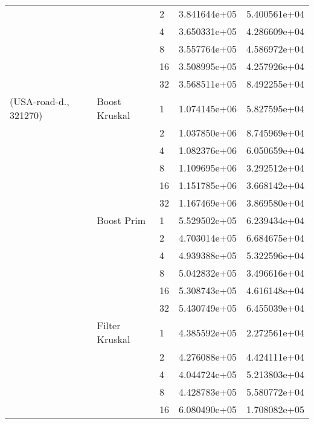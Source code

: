 \begin{tabular}{lllrr}
                       &                    & 2  &  3.841644e+05 &  5.400561e+04 \\
                       &                    & 4  &  3.650331e+05 &  4.286609e+04 \\
                       &                    & 8  &  3.557764e+05 &  4.586972e+04 \\
                       &                    & 16 &  3.508995e+05 &  4.257926e+04 \\
                       &                    & 32 &  3.568511e+05 &  8.492255e+04 \\
(USA-road-d., 321270) & Boost Kruskal & 1  &  1.074145e+06 &  5.827595e+04 \\
                       &                    & 2  &  1.037850e+06 &  8.745969e+04 \\
                       &                    & 4  &  1.082376e+06 &  6.050659e+04 \\
                       &                    & 8  &  1.109695e+06 &  3.292512e+04 \\
                       &                    & 16 &  1.151785e+06 &  3.668142e+04 \\
                       &                    & 32 &  1.167469e+06 &  3.869580e+04 \\
                       & Boost Prim & 1  &  5.529502e+05 &  6.239434e+04 \\
                       &                    & 2  &  4.703014e+05 &  6.684675e+04 \\
                       &                    & 4  &  4.939388e+05 &  5.322596e+04 \\
                       &                    & 8  &  5.042832e+05 &  3.496616e+04 \\
                       &                    & 16 &  5.308743e+05 &  4.616148e+04 \\
                       &                    & 32 &  5.430749e+05 &  6.455039e+04 \\
                       & Filter Kruskal & 1  &  4.385592e+05 &  2.272561e+04 \\
                       &                    & 2  &  4.276088e+05 &  4.424111e+04 \\
                       &                    & 4  &  4.044724e+05 &  5.213803e+04 \\
                       &                    & 8  &  4.428783e+05 &  5.580772e+04 \\
                       &                    & 16 &  6.080490e+05 &  1.708082e+05 \\

\end{tabular}

